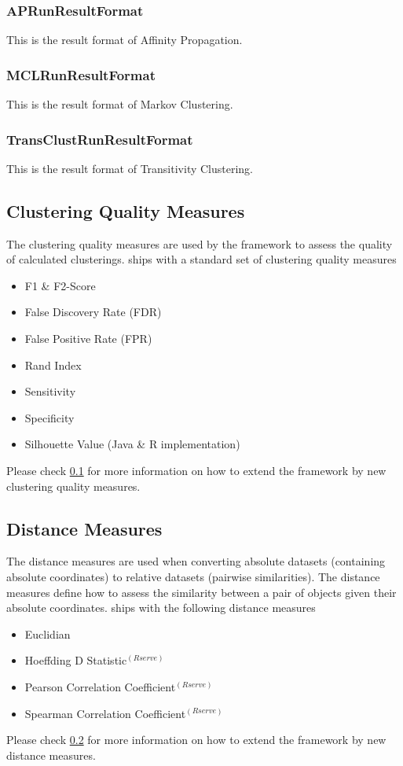 		\subsubsection{APRunResultFormat}
		This is the result format of Affinity Propagation.
		\subsubsection{MCLRunResultFormat}
		This is the result format of Markov Clustering.
		\subsubsection{TransClustRunResultFormat}
		This is the result format of Transitivity Clustering.
		

	\subsection{Clustering Quality Measures}\label{clustQualMeasures}
	The clustering quality measures are used by the framework to assess the quality of calculated clusterings. \clusteval ships with a standard set of clustering quality measures
	\begin{itemize}
		\item F1 \& F2-Score
		\item False Discovery Rate (FDR)
		\item False Positive Rate (FPR)
		\item Rand Index
		\item Sensitivity
		\item Specificity
		\item Silhouette Value (Java \& R implementation)
	\end{itemize}
	Please check \ref{clustQualMeasures} for more information on how to extend the framework by new clustering quality measures.
	\subsection{Distance Measures}\label{distanceMeasures}
	 The distance measures are used when converting absolute datasets (containing absolute coordinates) to relative datasets (pairwise similarities). The distance measures define how to assess the similarity between a pair of objects given their absolute coordinates.
	\clusteval ships with the following distance measures
	\begin{itemize}
		\item Euclidian
		\item Hoeffding D Statistic$^{(Rserve)}$
		\item Pearson Correlation Coefficient$^{(Rserve)}$
		\item Spearman Correlation Coefficient$^{(Rserve)}$
	\end{itemize}
	Please check \ref{distanceMeasures} for more information on how to extend the framework by new distance measures.
